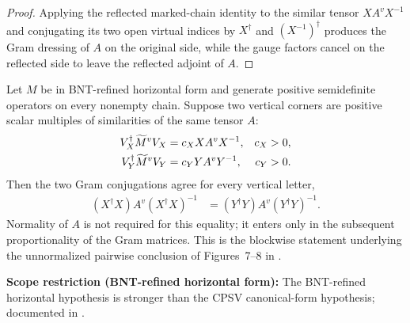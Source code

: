 \begin{proof}
    \leanok
    Applying the reflected marked-chain identity to the similar tensor
    $XA^vX^{-1}$ and conjugating its two open virtual indices by $X^\dagger$
    and $(X^{-1})^\dagger$ produces the Gram dressing of $A$ on the original
    side, while the gauge factors cancel on the reflected side to leave the
    reflected adjoint of $A$.
\end{proof}

\begin{lemma}
    \label{thm:mpdo_pairwise_vertical_gram_conjugation}
    \leanok
    Let $M$ be in BNT-refined horizontal form and generate positive
    semidefinite operators on every nonempty chain. Suppose two vertical
    corners are positive scalar multiples of similarities of the same tensor
    $A$:
    \begin{align}
        V_X^\dagger\widetilde M^vV_X
            & =c_X X A^vX^{-1},
            &
        c_X & >0,
        \notag                  \\
        V_Y^\dagger\widetilde M^vV_Y
            & =c_Y Y A^vY^{-1},
            &
        c_Y & >0.
        \notag
    \end{align}
    Then the two Gram conjugations agree for every vertical letter,
    \begin{align}
        (X^\dagger X)A^v(X^\dagger X)^{-1}
         & =(Y^\dagger Y)A^v(Y^\dagger Y)^{-1}.
        \label{eq:mpdo_pairwise_gram_conj}
    \end{align}
    Normality of $A$ is not required for this equality; it enters only in
    the subsequent proportionality of the Gram matrices. This is the blockwise
    statement underlying the unnormalized
    pairwise conclusion of Figures~7--8 in
    \cite[Proposition~4.13, lines~1909--1919]{Cirac2016MPDO_arXiv}.

    \textbf{Scope restriction (BNT-refined horizontal form):}
    The BNT-refined horizontal hypothesis is stronger than the
    CPSV canonical-form hypothesis; documented in
    \cite{gap:cpgsv17_vertical_cf_grouping}.
\end{lemma}

